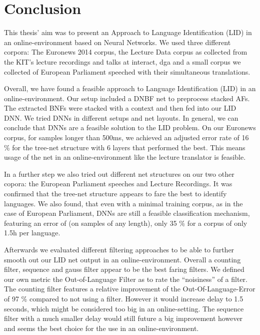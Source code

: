 
\chapter{Conclusion}
\label{ch:Conclusion}

This thesis' aim was to present an Approach to Language Identification (LID) in an online-environment based on Neural Networks. We used three different corpora: The Euronews 2014 corpus, the Lecture Data corpus as collected from the KIT's lecture recordings and talks at interact, dga and a small corpus we collected of European Parliament speeched with their simultaneous translations.

Overall, we have found a feasible approach to Language Identification (LID) in an online-environment. Our setup included a DNBF net to preprocess stacked AFs. The extracted BNFs were stacked with a context and then fed into our LID DNN.  We tried DNNs in different setups and net layouts. In general, we can conclude that DNNs are a feasible solution to the LID problem. On our Euronews corpus, for samples longer than 500ms, we achieved an adjusted error rate of 16 \% for the tree-net structure with 6 layers that performed the best. This means usage of the net in an online-environment like the lecture translator is feasible.

In a further step we also tried out different net structures on our two other copora: the European Parliament speeches and Lecture Recordings. It was confirmed that the tree-net structure appears to fare the best to identify languages. We also found, that even with a minimal training corpus, as in the case of European Parliament, DNNs are still a feasible classification mechanism, featuring an error of (on samples of any length), only 35 \% for a corpus of only 1.5h per language. 

Afterwards we evaluated different filtering approaches to be able to further smooth out our LID net output in an online-environment. Overall a counting filter, sequence and gauss filter appear to be the best faring filters. We defined our own metric the Out-of-Language Filter as to rate the ``noisiness'' of a filter. The counting filter features a relative improvement of the Out-Of-Language-Error of 97 \% compared to not using a filter. However it would increase delay to 1.5 seconds, which might be considered too big in an online-setting. The sequence filter with a much smaller delay would still future a big improvement however and seems the best choice for the use in an online-environment.

